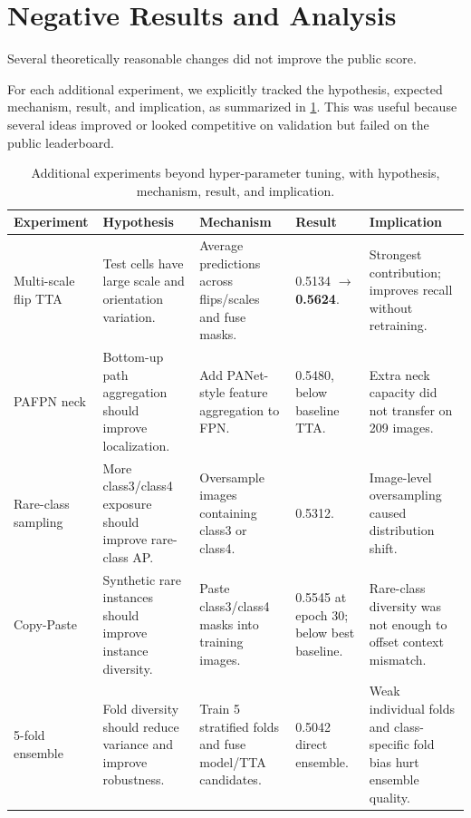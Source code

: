 \documentclass[10pt,twocolumn,letterpaper]{article}
\begin{document}
\section{Negative Results and Analysis}
\label{sec:negative}

Several theoretically reasonable changes did not improve the public score.

For each additional experiment, we explicitly tracked the hypothesis, expected mechanism, result, and implication, as summarized in \cref{tab:hypotheses}. This was useful because several ideas improved or looked competitive on validation but failed on the public leaderboard.

\begin{table}[t]
  \centering
  \scriptsize
  \setlength{\tabcolsep}{3pt}
  \begin{tabularx}{\textwidth}{p{}X X p{} X}
    \toprule
    \textbf{Experiment} & \textbf{Hypothesis} & \textbf{Mechanism} & \textbf{Result} & \textbf{Implication} \\ \midrule
    Multi-scale flip TTA & Test cells have large scale and orientation variation. & Average predictions across flips/scales and fuse masks. & 0.5134 $\rightarrow$ \textbf{0.5624}. & Strongest contribution; improves recall without retraining. \\
    PAFPN neck & Bottom-up path aggregation should improve localization. & Add PANet-style feature aggregation to FPN. & 0.5480, below baseline TTA. & Extra neck capacity did not transfer on 209 images. \\
    Rare-class sampling & More class3/class4 exposure should improve rare-class AP. & Oversample images containing class3 or class4. & 0.5312. & Image-level oversampling caused distribution shift. \\
    Copy-Paste & Synthetic rare instances should improve instance diversity. & Paste class3/class4 masks into training images. & 0.5545 at epoch 30; below best baseline. & Rare-class diversity was not enough to offset context mismatch. \\
    5-fold ensemble & Fold diversity should reduce variance and improve robustness. & Train 5 stratified folds and fuse model/TTA candidates. & 0.5042 direct ensemble. & Weak individual folds and class-specific fold bias hurt ensemble quality. \\
    \bottomrule
  \end{tabularx}
  \caption{Additional experiments beyond hyper-parameter tuning, with hypothesis, mechanism, result, and implication.}
  \label{tab:hypotheses}
\end{table}
\end{document}
